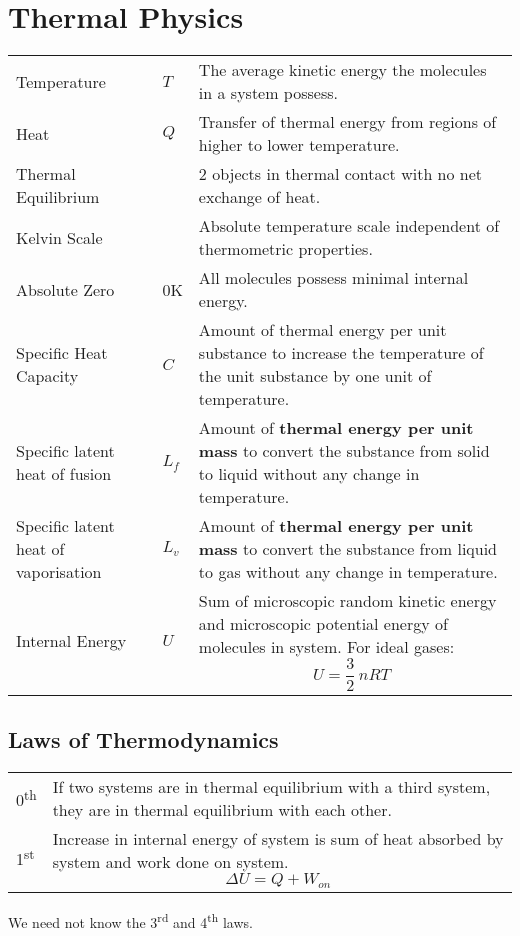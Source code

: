 \documentclass[a4paper]{article}
\begin{document}
	\section{Thermal Physics}
		\begin{center}
			\renewcommand{\arraystretch}{1.2}
			\begin{tabular}{@{} l l p{8.5cm} @{}}
				\toprule
				Temperature & $T$ & The average kinetic energy the molecules in a system possess. \\
				Heat & $Q$ & Transfer of thermal energy from regions of higher to lower temperature. \\
				Thermal Equilibrium & & 2 objects in thermal contact with no net exchange of heat. \\
				Kelvin Scale & & Absolute temperature scale independent of thermometric properties. \\
				Absolute Zero & 0K & All molecules possess minimal internal energy. \\
				Specific Heat Capacity & $C$ & Amount of thermal energy per unit substance to increase the temperature of the unit substance by one unit of temperature. \\
				Specific latent heat of fusion & $L_f$ & Amount of \textbf{thermal energy per unit mass} to convert the substance from solid to liquid without any change in temperature. \\
				Specific latent heat of vaporisation & $L_v$ & Amount of \textbf{thermal energy per unit mass} to convert the substance from liquid to gas without any change in temperature. \\
				Internal Energy & $U$ & Sum of microscopic random kinetic energy and microscopic potential energy of molecules in system. For ideal gases: $$U=\frac{3}{2}~nRT$$ \vspace*{-\baselineskip} \\ 
				\bottomrule
			\end{tabular}
		\end{center}
		\subsection{Laws of Thermodynamics}
			\begin{center}
				\renewcommand{\arraystretch}{1.2}
				\begin{tabular}{@{} l p{11cm} @{}}
					\toprule
					0\textsuperscript{th} & If two systems are in thermal equilibrium with a third system, they are in thermal equilibrium with each other. \\
					1\textsuperscript{st} & Increase in internal energy of system is sum of heat absorbed by system and work done on system. $$\Delta U = Q + W_{on}$$ \vspace*{-\baselineskip} \\
					\bottomrule
				\end{tabular}
			\end{center}
			We need not know the 3\textsuperscript{rd} and 4\textsuperscript{th} laws.
\end{document}

